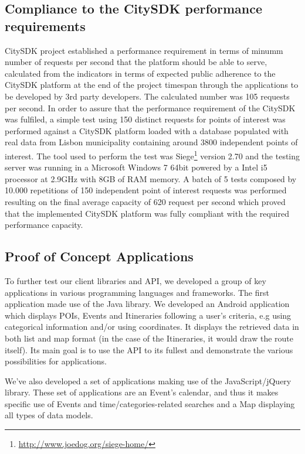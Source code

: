 \documentclass[times]{ettauth}
\begin{document}
\subsection{Compliance to the CitySDK performance requirements}
CitySDK project established a performance requirement in terms of minumm number of requests per second that the platform should be able to serve, calculated from the indicators in terms of expected public adherence to the CitySDK platform at the end of the project timespan through the applications to be developed by 3rd party developers. The calculated number was 105 requests per second. 
In order to assure that the performance requirement of the CitySDK was fulfiled, a simple test using 150 distinct requests for points of interest was performed against a CitySDK platform loaded with a database populated with real data from Lisbon municipality containing around 3800 independent points of interest. The tool used to perform the test was Siege\footnote{\url{http://www.joedog.org/siege-home/}} version 2.70 and the testing server was running in a Microsoft Windows 7 64bit powered by a Intel i5 processor at 2.9GHz with 8GB of RAM memory.
A batch of 5 tests composed by 10.000 repetitions of 150 independent point of interest requests was performed resulting on the final average capacity of 620 request per second which proved that the implemented CitySDK platform was fully compliant with the required performance capacity.

\subsection{Proof of Concept Applications}
To further test our client libraries and API, we developed a group of key applications in various programming languages and frameworks.
The first application made use of the Java library. We developed an Android application which displays \acp{POI}, Events and Itineraries following a user's criteria, e.g using categorical information and/or using coordinates. It displays the retrieved data in both list and map format (in the case of the Itineraries, it would draw the route itself). Its main goal is to use the API to its fullest and demonstrate the various possibilities for applications.

We've also developed a set of applications making use of the JavaScript/jQuery library. These set of applications are an Event's calendar, and thus it makes specific use of Events and time/categories-related searches and a Map displaying all types of data models.
\end{document}
